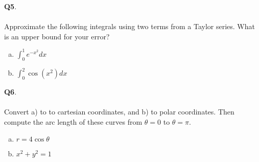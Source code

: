 \documentclass[12pt, oneside]{amsart}
\begin{document}
\newpage
\noindent
\textbf{Q5}. \\ \\ Approximate the following integrals using two terms from a Taylor series. What is an upper bound for your error? \\
\begin{enumerate}[a)]
  \item
$\displaystyle{\int_{0}^{1} e^{-x^{2}}dx}$
    \vspace{6cm}
  \item
$\displaystyle{\int_{0}^{2} \cos(x^{2})dx}$
  \newpage
\end{enumerate}
\textbf{Q6}. \\ \\ Convert a) to to cartesian coordinates, and b) to polar coordinates. Then compute the arc length of these curves from $\theta = 0$ to $\theta = \pi$. \\ 
\begin{enumerate}[a)]
  \item
$\displaystyle{r=4 \cos \theta}$
    \vspace{6cm}
  \item
    $\displaystyle{x^{2} + y^{2} = 1}$
\vspace{6cm}
  \newpage
\end{enumerate}
\end{document}
